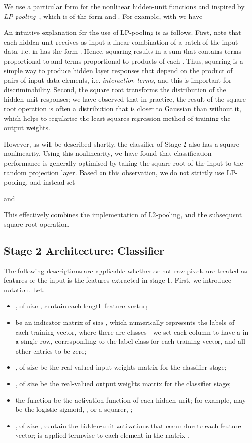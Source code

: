 \documentclass[conference]{IEEEtran}
\begin{document}
We use a particular  form for the nonlinear hidden-unit functions  and   inspired by {\em LP-pooling}~\cite{Sermanet.12}, which is of the form  and
. For example, with  we have


An intuitive explanation for the use of LP-pooling is as follows. First, note that each hidden unit receives as input a linear combination of a patch of the input data, i.e.  in  has the form . Hence, squaring  results in a sum that contains  terms proportional to  and terms proportional to products of each . Thus, squaring is a simple way to produce hidden layer responses that depend on the product of pairs of input data elements, i.e. {\em interaction terms}, and this is important for discriminability.  Second, the square root transforms the distribution of the hidden-unit responses; we have observed that in practice, the result of the square root operation is often a distribution that is closer to Gaussian than without it, which helps to regularise the least squares regression method of training the output weights.

However, as will be described shortly, the classifier of Stage 2 also has a square nonlinearity. Using this nonlinearity, we have found that classification performance is generally optimised by taking the square root of the input to the random projection layer.  Based on this observation, we do not strictly use LP-pooling, and instead set 

and

This effectively combines the implementation of L2-pooling, and the subsequent square root operation.


\subsection{Stage 2 Architecture: Classifier}

The following descriptions are applicable whether or not  raw pixels are treated as features or the input is the features extracted in stage 1.
First, we introduce notation. Let:
\begin{itemize}
\item , of size , contain each length  feature vector;
\item  be an indicator matrix of size , which numerically represents the labels of each training vector, where there are  classes---we set each column to have a  in a single row, corresponding to the label class for each training vector, and all other entries to be zero;
\item , of size  be the real-valued input weights matrix for the classifier stage;
\item , of size  be the real-valued output weights matrix for the classifier stage;
\item the function  be the activation function of each hidden-unit; for example,  may be the logistic sigmoid, , or a squarer, ;
\item , of size , contain the hidden-unit activations that occur due to each feature vector;  is applied termwise to each element in the matrix  .
\end{itemize}
\end{document}

